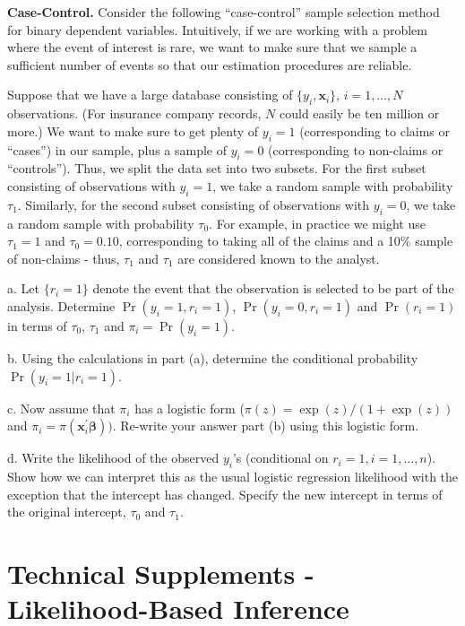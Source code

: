 \begin{exercises}
\newpage
\item \textbf{Case-Control.} Consider the following ``case-control'' sample selection method for
binary dependent variables. Intuitively, if we are working with a
problem where the event of interest is rare, we want to make sure
that we sample a sufficient number of events so that our estimation
procedures are reliable.

Suppose that we have a large database consisting of $\{y_i,
\mathbf{x}_i\}$, $i=1,\ldots, N$ observations. (For insurance
company records, $N$ could easily be ten million or more.) We want
to make sure to get plenty of $y_i = 1$ (corresponding to claims or
``cases'') in our sample, plus a sample of $y_i = 0$ (corresponding
to non-claims or ``controls''). Thus, we split the data set into two
subsets. For the first subset consisting of observations with $y_i =
1$, we take a random sample with probability $\tau_1$. Similarly,
for the second subset consisting of observations with $y_i = 0$, we
take a random sample with probability $\tau_0$. For example, in
practice we might use $\tau_1=1$ and  $\tau_0 = 0.10$, corresponding
to taking all of the claims and a 10\% sample of non-claims - thus,
$\tau_1$ and $\tau_1$ are considered known to the analyst.


a. Let $\{r_i = 1\}$ denote the event that the observation is
selected to be part of the analysis. Determine $\Pr(y_i = 1, r_i =
1)$, $\Pr(y_i = 0, r_i = 1)$ and $\Pr(r_i = 1)$
 in terms of $\tau_0$, $\tau_1$ and $\pi_i = \Pr(y_i=1)$.

b. Using the calculations in part (a), determine the conditional
probability $\Pr(y_i=1 | r_i=1)$.

c. Now assume that $\pi_i $  has a logistic form ($\pi(z) =
\exp(z)/(1+\exp(z))$ and $\pi_i=
\pi(\mathbf{x}_i^{\prime}\boldsymbol \beta ))$. Re-write your answer
part (b) using this logistic form.

d. Write the likelihood of the observed $y_i$'s (conditional on $r_i
= 1, i=1, \ldots, n$). Show how we can interpret this as the usual
logistic regression likelihood with the exception that the intercept
has changed. Specify the new intercept in terms of the original
intercept,  $\tau_0$ and $\tau_1$.




\end{exercises}



\section{Technical Supplements - Likelihood-Based
Inference}\label{S11:LikelihoodInference}

